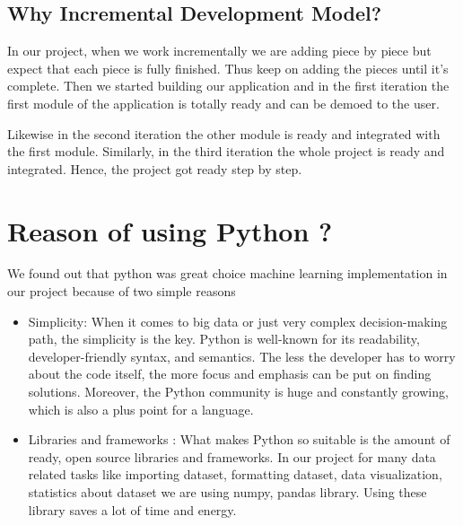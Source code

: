 \subsection{Why Incremental Development Model?}
 In our project, when we work incrementally we are adding piece by piece but expect that each piece is fully finished. Thus keep on adding the pieces until it’s complete. 
Then we started building our application and in the first iteration the first module of the application is totally ready and can be demoed to the user.\par
Likewise in the second iteration the other module is ready and integrated with the first module. Similarly, in the third iteration the whole project is ready and integrated. Hence, the project got ready step by step.
\section{Reason of using  Python ?}
We found out that python was great choice machine learning implementation in our project because of two simple reasons
\begin{itemize}
\item Simplicity: When it comes to big data or just very complex decision-making path, the simplicity is the key. Python is well-known for its readability, developer-friendly syntax, and semantics. The less the developer has to worry about the code itself, the more focus and emphasis can be put on finding solutions. Moreover, the Python community is huge and constantly growing, which is also a plus point for a language.
\item Libraries and frameworks : What makes Python so suitable is the amount of ready, open source libraries and frameworks. In our project for many data related tasks like importing dataset, formatting dataset, data visualization, statistics about dataset we are using numpy, pandas library. Using these library saves a lot of time and energy.

\end{itemize}



